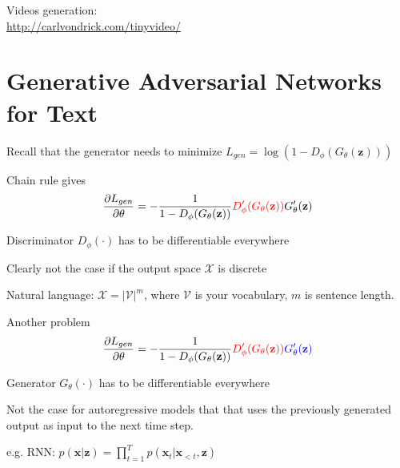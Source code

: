 \documentclass{beamer}
\let\tempone\itemize
\let\temptwo\enditemize
\renewenvironment{itemize}{\tempone\addtolength{\itemsep}{0.5\baselineskip}}{\temptwo}
\newcommand{\zvec}{\mathbf{z}}
\newcommand{\xvec}{\mathbf{x}}
\begin{document}
\begin{frame}
\begin{center}
\end{center}
\center
Videos generation: \\ \url{http://carlvondrick.com/tinyvideo/}
\end{frame}


\section{Generative Adversarial Networks for Text} 
\begin{frame}
\begin{center}
\end{center}
\begin{itemize}
\item Recall that the generator needs to minimize $L_{gen} = \log (1-D_\phi(G_\theta(\zvec)))$ \pause
\item Chain rule gives
\[ \frac{\partial L_{gen}}{\partial \theta} = -\frac{1}{1-D_\phi(G_\theta(\zvec))}{\color{red} D'_\phi(G_\theta(\zvec))}G_\theta'(\zvec)\]
\item Discriminator $D_\phi(\cdot)$ has to be differentiable everywhere \pause
\item Clearly not the case if the output space $\mathcal{X}$ is discrete 
\pause
\item Natural language: $\mathcal{X} = |\mathcal{V}|^m$, where $\mathcal{V}$ is your vocabulary, $m$ is sentence length.
\end{itemize}
\end{frame}

\begin{frame}
\begin{center}
\end{center}
\begin{itemize} 
\item Another problem
\[ \frac{\partial L_{gen}}{\partial \theta} = -\frac{1}{1-D_\phi(G_\theta(\zvec))}{\color{red} D'_\phi(G_\theta(\zvec))}{\color{blue}G_\theta'(\zvec)}\] 
\item Generator $G_\theta(\cdot)$ has to be differentiable everywhere \pause
\item Not the case for autoregressive models that that uses the previously generated output as input to the next time step.
\item e.g. RNN: $p(\xvec | \zvec) = \prod_{t=1}^T p(\xvec_t | \xvec_{<t}, \zvec)$
\end{itemize}
\end{frame}
\end{document}
